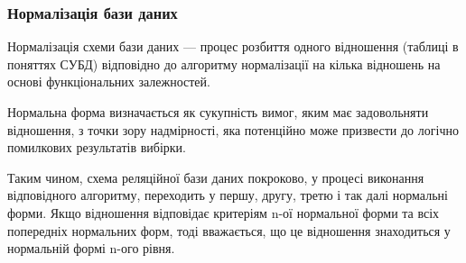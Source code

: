 \subsubsection{Нормалізація бази даних}

Нормалізація схеми бази даних — процес розбиття одного відношення (таблиці в поняттях СУБД) відповідно до алгоритму нормалізації на кілька відношень на основі функціональних залежностей.

Нормальна форма визначається як сукупність вимог, яким має задовольняти відношення, з точки зору надмірності, яка потенційно може призвести до логічно помилкових результатів вибірки.

Таким чином, схема реляційної бази даних покроково, у процесі виконання відповідного алгоритму, переходить у першу, другу, третю і так далі нормальні форми. Якщо відношення відповідає критеріям n-ої нормальної форми та всіх попередніх нормальних форм, тоді вважається, що це відношення знаходиться у нормальній формі n-ого рівня.
